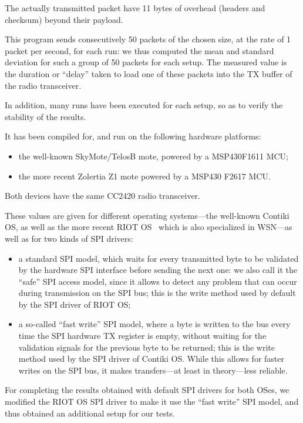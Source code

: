 \documentclass[10pt]{ewsn-proc}
\begin{document}
\medskip

The actually transmitted packet have 11 bytes of overhead (headers and
checksum) beyond their payload.

This program sends consecutively 50 packets of the chosen size, at the rate
of 1 packet per second, for each run: we thus computed the mean and
standard deviation for such a group of 50 packets for each setup.
The measured value is the duration or ``delay'' taken to load one of these
packets into the TX buffer of the radio transceiver.

In addition, many runs have been executed for each setup, so as to verify
the stability of the results.

It has been compiled for, and run on the following hardware platforms:
\begin{itemize}
\item the well-known SkyMote/TelosB mote, powered by a MSP430F1611 MCU;
\item the more recent Zolertia Z1 mote powered by a MSP430 F2617 MCU.
\end{itemize}

\smallskip

Both devices have the same CC2420 radio transceiver.

\medskip

These values are given for different operating systems---the well-known
Contiki OS, as well as the more recent RIOT OS~\cite{RIOT} which is also
specialized in WSN---as well as for two kinds of SPI drivers:
\begin{itemize}
\item a standard SPI model, which waits for every transmitted byte to be
validated by the hardware SPI interface before sending the next one:
we also call it the ``safe'' SPI access model, since it allows to detect
any problem that can occur during transmission on the SPI bus; this is
the write method used by default by the SPI driver of RIOT OS;
\item a so-called ``fast write'' SPI model, where a byte is written to
the bus every time the SPI hardware TX register is empty, without waiting
for the validation signals for the previous byte to be returned; this is
the write method used by the SPI driver of Contiki OS. While this allows
for faster writes on the SPI bus, it makes transfers---at least in
theory---less reliable.
\end{itemize}

\medskip

For completing the results obtained with default SPI drivers for both OSes,
we modified the RIOT OS SPI driver to make it use the ``fast write''
SPI model, and thus obtained an additional setup for our tests.
\end{document}
